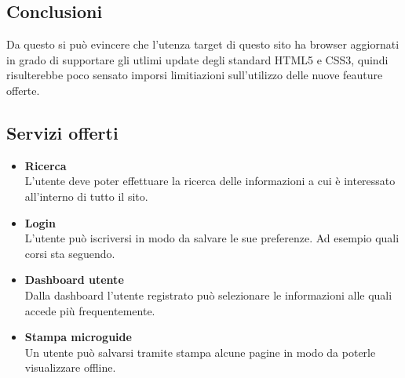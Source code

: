 \subsection{Conclusioni}
Da questo si può evincere che l'utenza target di questo sito ha browser aggiornati in grado di supportare gli utlimi update degli standard HTML5 e CSS3, quindi risulterebbe poco sensato imporsi limitiazioni sull'utilizzo delle nuove feauture offerte.

\subsection{Servizi offerti}
\begin{itemize}
    \item \textbf{Ricerca} \\ L'utente deve poter effettuare la ricerca delle informazioni a cui è interessato all'interno di tutto il sito.
    \item \textbf{Login} \\ L'utente può iscriversi in modo da salvare le sue preferenze. Ad esempio quali corsi sta seguendo.
    \item \textbf{Dashboard utente} \\ Dalla dashboard l'utente registrato può selezionare le informazioni alle quali accede più frequentemente.
    \item \textbf{Stampa microguide} \\ Un utente può salvarsi tramite stampa alcune pagine in modo da poterle visualizzare offline.
\end{itemize}